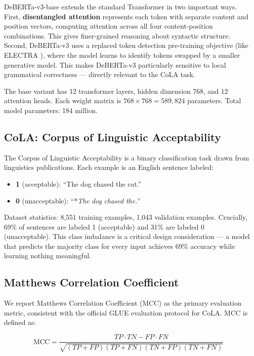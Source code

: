 \documentclass[12pt,a4paper]{article}
\theoremstyle{definition}
\begin{document}
DeBERTa-v3-base \cite{he2021debertav3} extends the standard Transformer in two important ways. First, \textbf{disentangled attention} represents each token with separate content and position vectors, computing attention across all four content-position combinations. This gives finer-grained reasoning about syntactic structure. Second, DeBERTa-v3 uses a replaced token detection pre-training objective (like ELECTRA \cite{clark2020electra}), where the model learns to identify tokens swapped by a smaller generative model. This makes DeBERTa-v3 particularly sensitive to local grammatical correctness — directly relevant to the CoLA task.

The base variant has 12 transformer layers, hidden dimension 768, and 12 attention heads. Each weight matrix is $768 \times 768 = 589{,}824$ parameters. Total model parameters: 184 million.

\subsection{CoLA: Corpus of Linguistic Acceptability}

The Corpus of Linguistic Acceptability \cite{warstadt2019neural} is a binary classification task drawn from linguistics publications. Each example is an English sentence labeled:
\begin{itemize}
    \item \textbf{1} (acceptable): ``The dog chased the cat.''
    \item \textbf{0} (unacceptable): ``*\textit{The dog chased the.}''
\end{itemize}

Dataset statistics: 8,551 training examples, 1,043 validation examples. Crucially, 69\% of sentences are labeled 1 (acceptable) and 31\% are labeled 0 (unacceptable). This class imbalance is a critical design consideration — a model that predicts the majority class for every input achieves 69\% accuracy while learning nothing meaningful.

\subsection{Matthews Correlation Coefficient}

We report Matthews Correlation Coefficient (MCC) as the primary evaluation metric, consistent with the official GLUE evaluation protocol for CoLA. MCC is defined as:

\begin{equation}
\text{MCC} = \frac{TP \cdot TN - FP \cdot FN}{\sqrt{(TP+FP)(TP+FN)(TN+FP)(TN+FN)}}
\end{equation}
\end{document}
